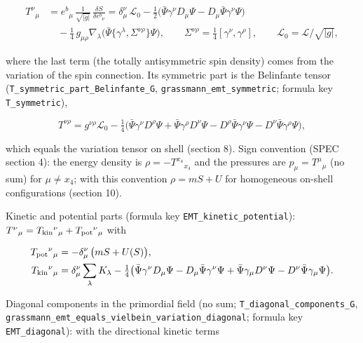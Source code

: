 \documentclass[11pt]{article}
\begin{document}
\[
\begin{aligned}
T^\nu{}_\mu &= e^b{}_\mu\,\frac{1}{\sqrt{|g|}}\,\frac{\delta S}{\delta e^b{}_\nu}
= \delta^\nu_\mu\,\mathcal{L}_0 - \tfrac12\big(\bar\Psi\gamma^\nu D_\mu\Psi - D_\mu\bar\Psi\gamma^\nu\Psi\big) \\
&\quad - \tfrac14\,g_{\mu\rho}\nabla_\lambda\big(\bar\Psi\{\gamma^\lambda, \Sigma^{\nu\rho}\}\Psi\big),
\qquad \Sigma^{\nu\rho} = \tfrac14[\gamma^\nu, \gamma^\rho],\qquad \mathcal{L}_0 = \mathcal{L}/\sqrt{|g|},
\end{aligned}
\]

where the last term (the totally antisymmetric spin density) comes from the variation of the spin connection. Its symmetric part is the Belinfante tensor (\texttt{T\_symmet\allowbreak{}ric\_part\allowbreak{}\_Belinfa\allowbreak{}nte\_G}, \texttt{grassman\allowbreak{}n\_emt\_sy\allowbreak{}mmetric}; formula key \texttt{T\_symmet\allowbreak{}ric}),

\[
T^{\nu\rho} = g^{\nu\rho}\mathcal{L}_0 - \tfrac14\big(\bar\Psi\gamma^\nu D^\rho\Psi + \bar\Psi\gamma^\rho D^\nu\Psi - D^\rho\bar\Psi\gamma^\nu\Psi - D^\nu\bar\Psi\gamma^\rho\Psi\big),
\]

which equals the variation tensor on shell (section 8). Sign convention (SPEC section 4): the energy density is $\rho = -T^{x_4}{}_{x_4}$ and the pressures are $p_\mu = T^\mu{}_\mu$ (no sum) for $\mu \neq x_4$; with this convention $\rho = mS + U$ for homogeneous on-shell configurations (section 10).

Kinetic and potential parts (formula key \texttt{EMT\_kine\allowbreak{}tic\_pote\allowbreak{}ntial}): $T^\nu{}_\mu = T_{\rm kin}{}^\nu{}_\mu + T_{\rm pot}{}^\nu{}_\mu$ with

\[
\begin{aligned}
T_{\rm pot}{}^\nu{}_\mu &= -\delta^\nu_\mu\,\big(mS + U(S)\big), \\
T_{\rm kin}{}^\nu{}_\mu &= \delta^\nu_\mu\sum_\lambda K_\lambda - \tfrac14\big(\bar\Psi\gamma^\nu D_\mu\Psi - D_\mu\bar\Psi\gamma^\nu\Psi + \bar\Psi\gamma_\mu D^\nu\Psi - D^\nu\bar\Psi\gamma_\mu\Psi\big).
\end{aligned}
\]

Diagonal components in the primordial field (no sum; \texttt{T\_diagon\allowbreak{}al\_compo\allowbreak{}nents\_G}, \texttt{grassman\allowbreak{}n\_emt\_eq\allowbreak{}uals\_vie\allowbreak{}lbein\_va\allowbreak{}riation\_\allowbreak{}diagonal}; formula key \texttt{EMT\_diag\allowbreak{}onal}): with the directional kinetic terms
\end{document}
